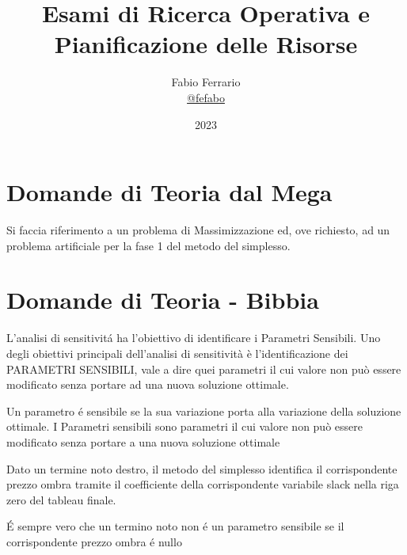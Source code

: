 \documentclass[12pt, a4paper, openany]{book}
\begin{document}
\title{Esami di Ricerca Operativa e Pianificazione delle Risorse}
\author{
	Fabio Ferrario\\
	\small{\href{https://t.me/fefabo}{@fefabo}}
}

\date{2023}
\maketitle


\tableofcontents

\chapter{Domande di Teoria dal Mega}
Si faccia riferimento a un problema di Massimizzazione ed, ove richiesto, ad un problema artificiale per la fase 1 del metodo del simplesso.



\chapter{Domande di Teoria - Bibbia}


\affermazionetrue
{L'analisi di sensitivitá ha l'obiettivo di identificare i Parametri Sensibili.}
{Uno degli obiettivi principali dell'analisi di sensitività è l'identificazione dei PARAMETRI SENSIBILI, vale
a dire quei parametri il cui valore non può essere modificato senza portare ad una nuova soluzione
ottimale.}

\affermazionetrue
{Un parametro é sensibile se la sua variazione porta alla variazione della soluzione ottimale.}
{I Parametri sensibili sono parametri il cui valore non può essere modificato senza portare a una nuova soluzione ottimale}

\affermazionetrue
{Dato un termine noto destro, il metodo del simplesso identifica il corrispondente prezzo ombra tramite il coefficiente
della corrispondente variabile slack nella riga zero del tableau finale.}
{}

\affermazione
{É sempre vero che un termino noto non é un parametro sensibile se il corrispondente prezzo ombra é nullo}
\end{document}

